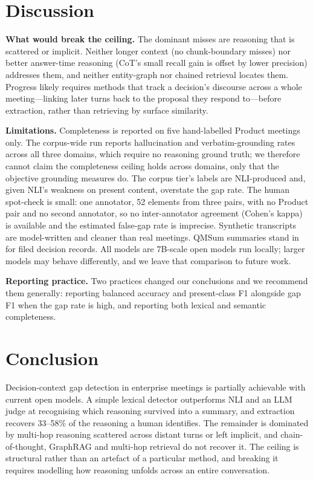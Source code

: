 \documentclass[conference]{IEEEtran}
\begin{document}
\section{Discussion}

\textbf{What would break the ceiling.} The dominant misses are reasoning that is
scattered or implicit. Neither longer context (no chunk-boundary misses) nor
better answer-time reasoning (CoT's small recall gain is offset by lower
precision) addresses them, and neither
entity-graph nor chained retrieval locates them. Progress likely requires
methods that track a decision's discourse across a whole meeting---linking later
turns back to the proposal they respond to---before extraction, rather than
retrieving by surface similarity.

\textbf{Limitations.} Completeness is reported on five hand-labelled Product
meetings only. The corpus-wide run reports hallucination and verbatim-grounding
rates across all three domains, which require no reasoning ground truth; we
therefore cannot claim the completeness ceiling holds across domains, only that
the objective grounding measures do. The corpus tier's labels are NLI-produced
and, given NLI's weakness on present content, overstate the gap rate.
The human spot-check is small: one annotator, 52 elements from three pairs,
with no Product pair and no second annotator, so no inter-annotator agreement
(Cohen's kappa) is available and the estimated false-gap rate is imprecise. Synthetic transcripts
are model-written and cleaner than real meetings. QMSum summaries stand in for
filed decision records. All models are 7B-scale open models run locally;
larger models may behave differently, and we leave that comparison to future
work.

\textbf{Reporting practice.} Two practices changed our conclusions and we
recommend them generally: reporting balanced accuracy and present-class F1
alongside gap F1 when the gap rate is high, and reporting both lexical and
semantic completeness.

\section{Conclusion}

Decision-context gap detection in enterprise meetings is partially achievable
with current open models. A simple lexical detector outperforms NLI and an LLM
judge at recognising which reasoning survived into a summary, and extraction
recovers 33--58\% of the reasoning a human identifies. The remainder is
dominated by multi-hop reasoning scattered across distant turns or left
implicit, and chain-of-thought, GraphRAG and multi-hop retrieval do not recover
it. The ceiling is structural rather than an artefact of a particular method,
and breaking it requires modelling how reasoning unfolds across an entire
conversation.



\end{document}

